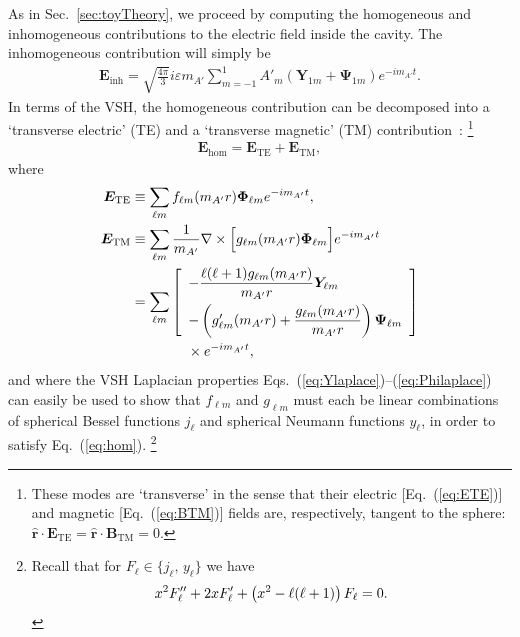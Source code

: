\documentclass[amsmath,amssymb,aps,10pt,prd,letterpaper,nofootinbib,balancelastpage,notitlepage,superscriptaddress,twocolumn,floatfix]{revtex4-2}
\newcommand{\secref}[2][]{Sec{#1}.~\ref{#2}}		%
\renewcommand{\eqref}[2][]{Eq{#1}.~(\ref{eq:#2})}	%
\newcommand{\eqrefRange}[2]{Eqs.~(\ref{eq:#1})--(\ref{eq:#2})}
\newcommand{\lb}{\ensuremath{\left}}					%
\newcommand{\rb}{\ensuremath{\right}}					%
\newcommand{\nl}{\nonumber \\ & \quad }					%
\begin{document}
As in \secref{sec:toyTheory}, we proceed by computing the homogeneous and inhomogeneous contributions to the electric field inside the cavity.
The inhomogeneous contribution will simply be
\begin{align}
    \bm{E}_\text{inh}=\sqrt{\frac{4\pi}3}i\varepsilon m_{A'}\sum_{m=-1}^1A'_m(\bm{Y}_{1m}+\bm{\Psi}_{1m})e^{-im_{A'}t}.
    \label{eq:inhom_sph}
\end{align}
In terms of the VSH, the homogeneous contribution can be decomposed into a `transverse electric' (TE) and a `transverse magnetic' (TM) contribution~\cite{Jackson}:%
\footnote{\label{ftnt:TEmode}%
    These modes are `transverse' in the sense that their electric [\eqref{ETE}] and magnetic [\eqref{BTM}] fields are, respectively, tangent to the sphere: $\bm{\hat{r}}\cdot\bm E_\text{TE}=\bm{\hat{r}}\cdot\bm B_\text{TM}=0$.
} %
\begin{align}
    \bm E_\text{hom}=\bm E_\text{TE} + \bm E_\text{TM},
\end{align}
where
\begin{align}\label{eq:ETE}
    \bm E_\text{TE}&\equiv\sum_{\ell m}f_{\ell m}(m_{A'}r)\bm\Phi_{\ell m}e^{-im_{A'}t},\\
    \bm E_\text{TM}&\equiv\sum_{\ell m}\frac1{m_{A'}}\nabla\times\Big[g_{\ell m}(m_{A'}r)\bm\Phi_{\ell m}\Big]e^{-im_{A'}t}\nonumber\\&=\sum_{\ell m}\lb[\begin{array}{l}-\dfrac{\ell(\ell+1)g_{\ell m}(m_{A'}r)}{m_{A'}r}\bm Y_{\ell m}\\[2ex]-\left(g'_{\ell m}(m_{A'}r)+\dfrac{g_{\ell m}(m_{A'}r)}{m_{A'}r}\right)\bm\Psi_{\ell m}\end{array}\rb]\nl\qquad\quad \times e^{-im_{A'}t},
    \label{eq:ETM}
\end{align}
and where the VSH Laplacian properties \eqrefRange{Ylaplace}{Philaplace} can easily be used to show that $f_{\ell m}$ and $g_{\ell m}$ must each be linear combinations of spherical Bessel functions $j_\ell$ and spherical Neumann functions $y_\ell$, in order to satisfy \eqref{hom}.%
\footnote{\label{ftnt:sBsNfuncs}%
    Recall that for $F_\ell \in \{j_\ell,\,y_\ell\}$ we have~\cite{ArfkenWeber}
    \[ x^2 F_\ell'' + 2xF_\ell' + \lb(x^2 - \ell(\ell+1)\rb)F_\ell = 0. \]%
} %
\end{document}
